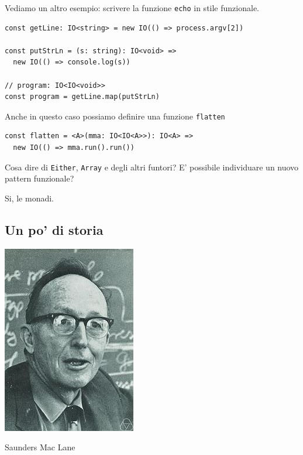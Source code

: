 \documentclass[12pt]{article}
\begin{document}
Vediamo un altro esempio: scrivere la funzione \texttt{echo} in stile funzionale.

\begin{verbatim}
const getLine: IO<string> = new IO(() => process.argv[2])

const putStrLn = (s: string): IO<void> =>
  new IO(() => console.log(s))

// program: IO<IO<void>>
const program = getLine.map(putStrLn)
\end{verbatim}

Anche in questo caso possiamo definire una funzione \texttt{flatten}

\begin{verbatim}
const flatten = <A>(mma: IO<IO<A>>): IO<A> =>
  new IO(() => mma.run().run())
\end{verbatim}

Cosa dire di \texttt{Either}, \texttt{Array} e degli altri funtori?
E' possibile individuare un nuovo pattern funzionale?

Si, le monadi.

\subsection{Un po' di storia}

\begin{center}
\includegraphics[scale=0.6]{maclane}

Saunders Mac Lane
\end{center}
\end{document}
